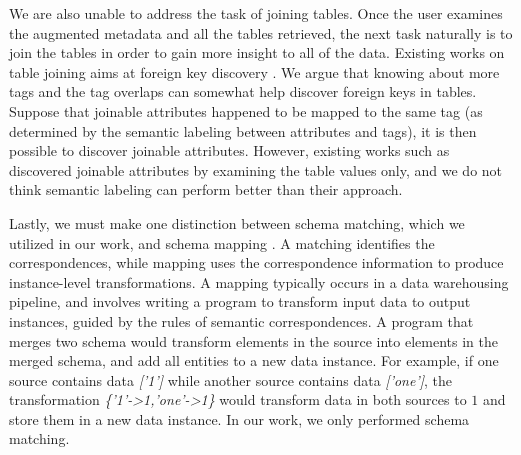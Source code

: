 We are also unable to address the task of joining tables. Once the user examines the augmented metadata and all the tables retrieved, the next task naturally is to join the tables in order to gain more insight to all of the data. Existing works on table joining aims at foreign key discovery \cite{Song2018GeoFlux}. We argue that knowing about more tags and the tag overlaps can somewhat help discover foreign keys in tables. Suppose that joinable attributes happened to be mapped to the same tag (as determined by the semantic labeling between attributes and tags), it is then possible to discover joinable attributes. However, existing works such as \cite{10.1145/3299869.3300065} \cite{10.14778/2994509.2994534} discovered joinable attributes by examining the table values only, and we do not think semantic labeling can perform better than their approach.

Lastly, we must make one distinction between schema matching, which we utilized in our work, and schema mapping \cite{Zhang2018Managing}. A matching identifies the correspondences, while mapping uses the correspondence information to produce instance-level transformations. A mapping typically occurs in a data warehousing pipeline, and involves writing a program to transform input data to output instances, guided by the rules of semantic correspondences. A program that merges two schema would transform elements in the source into elements in the merged schema, and add all entities to a new data instance. For example, if one source contains data \textit{['1']} while another source contains data \textit{['one']}, the transformation \textit{\{'1'->1,'one'->1\}} would transform data in both sources to $1$ and store them in a new data instance. In our work, we only performed schema matching.
\endinput
